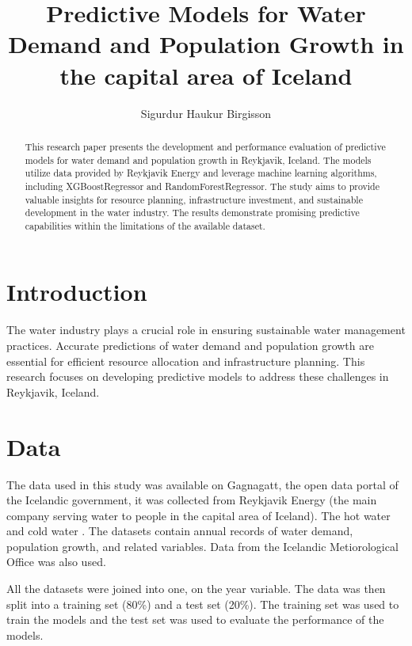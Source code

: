 \documentclass{article}
\begin{document}
\title{Predictive Models for Water Demand and Population Growth in the capital area of Iceland}
\author{Sigurdur Haukur Birgisson}

\maketitle

\begin{abstract}
    This research paper presents the development and performance evaluation of predictive models for water demand and population growth in Reykjavik, Iceland. The models utilize data provided by Reykjavik Energy and leverage machine learning algorithms, including XGBoostRegressor and RandomForestRegressor. The study aims to provide valuable insights for resource planning, infrastructure investment, and sustainable development in the water industry. The results demonstrate promising predictive capabilities within the limitations of the available dataset.
\end{abstract}

\section{Introduction}
The water industry plays a crucial role in ensuring sustainable water management practices. Accurate predictions of water demand and population growth are essential for efficient resource allocation and infrastructure planning. This research focuses on developing predictive models to address these challenges in Reykjavik, Iceland.

\section{Data}
The data used in this study was available on Gagnagatt, the open data portal of the Icelandic government, it was collected from Reykjavik Energy (the main company serving water to people in the capital area of Iceland). The hot water \cite{hot-water} and cold water \cite{cold-water}. The datasets contain annual records of water demand, population growth, and related variables. Data from the Icelandic Metiorological Office \cite{weather} was also used.

All the datasets were joined into one, on the year variable. The data was then split into a training set (80\%) and a test set (20\%). The training set was used to train the models and the test set was used to evaluate the performance of the models.
\end{document}

